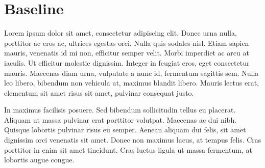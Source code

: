 \section{ Baseline }


Lorem ipsum dolor sit amet, consectetur adipiscing elit. Donec urna nulla, porttitor ac eros ac, ultrices egestas orci. 
Nulla quis sodales nisl. Etiam sapien mauris, venenatis id mi non, efficitur semper velit. Morbi imperdiet ac arcu at iaculis. 
Ut efficitur molestie dignissim. Integer in feugiat eros, eget consectetur mauris. Maecenas diam urna, vulputate a nunc id, fermentum sagittis sem. 
Nulla leo libero, bibendum non vehicula at, maximus blandit libero. Mauris lectus erat, elementum sit amet risus sit amet, pulvinar consequat justo. 


In maximus facilisis posuere. Sed bibendum sollicitudin tellus eu placerat. 
Aliquam ut massa pulvinar erat porttitor volutpat. Maecenas ac dui nibh. Quisque lobortis pulvinar risus eu semper. 
Aenean aliquam dui felis, sit amet dignissim orci venenatis sit amet. 
Donec non maximus lacus, at tempus felis. Cras porttitor in enim sit amet tincidunt. 
Cras luctus ligula ut massa fermentum, at lobortis augue congue. 

\pagebreak